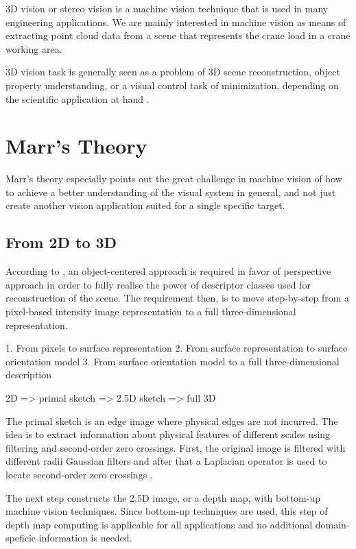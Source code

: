 \documentclass[12pt,a4paper,oneside,pdftex]{report}
\begin{document}
3D vision or stereo vision is a machine vision technique that is used in many engineering applications.
We are mainly interested in machine vision as means of extracting point cloud data from a scene that represents the crane load in a crane working area.

3D vision task is generally seen as a problem of 3D scene reconstruction, object property understanding, or a visual control task of minimization, depending on the scientific application at hand \cite{Sonka07}.

\section{Marr's Theory}

Marr's theory especially points out the great challenge in machine vision of how to achieve a better understanding of the visual system in general, and not just create another vision application suited for a single specific target.

\subsection{From 2D to 3D}

According to \cite{Sonka07}, an object-centered approach is required in favor of perspective approach in order to fully realise the power of descriptor classes used for reconstruction of the scene. The requirement then, is to move step-by-step from a pixel-based intensity image representation to a full three-dimensional representation.

1. From pixels to surface representation
2. From surface representation to surface orientation model
3. From surface orientation model to a full three-dimensional description

2D => primal sketch => 2.5D sketch => full 3D

The primal sketch is an edge image where physical edges are not incurred. The idea is to extract information about physical features of different scales using filtering and second-order zero crossings. First, the original image is filtered with different radii Gaussian filters and after that a Laplacian operator is used to locate second-order zero crossings \cite{Sonka07}. 

The next step constructs the 2.5D image, or a depth map, with bottom-up machine vision techniques. Since bottom-up techniques are used, this step of depth map computing is applicable for all applications and no additional domain-speficic information is needed. 
\end{document}
